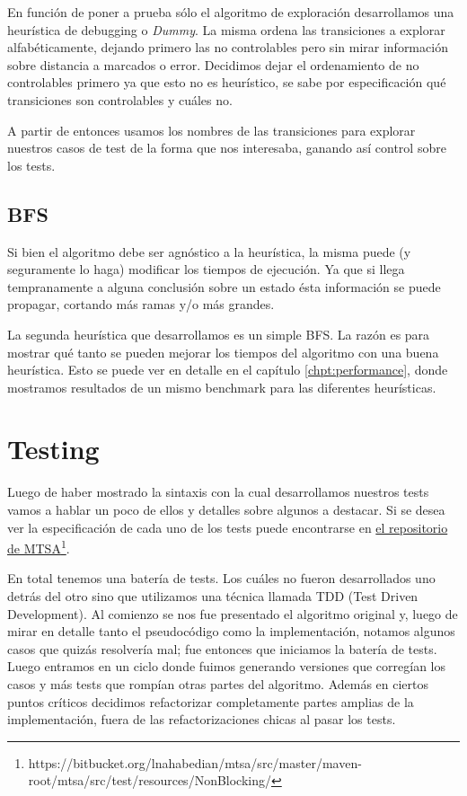 En función de poner a prueba sólo el algoritmo de exploración desarrollamos una heurística de debugging o \textit{Dummy}. La misma ordena las transiciones a explorar alfabéticamente, dejando primero las no controlables pero sin mirar información sobre distancia a marcados o error. Decidimos dejar el ordenamiento de no controlables primero ya que esto no es heurístico, se sabe por especificación qué transiciones son controlables y cuáles no.

A partir de entonces usamos los nombres de las transiciones para explorar nuestros casos de test de la forma que nos interesaba, ganando así control sobre los tests.

\subsection{BFS}
Si bien el algoritmo debe ser agnóstico a la heurística, la misma puede (y seguramente lo haga) modificar los tiempos de ejecución. Ya que si llega tempranamente a alguna conclusión sobre un estado ésta información se puede propagar, cortando más ramas y/o más grandes.

La segunda heurística que desarrollamos es un simple BFS. La razón es para mostrar qué tanto se pueden mejorar los tiempos del algoritmo con una buena heurística. Esto se puede ver en detalle en el capítulo \ref{chpt:performance}, donde mostramos resultados de un mismo benchmark para las diferentes heurísticas.

\section{Testing}
Luego de haber mostrado la sintaxis con la cual desarrollamos nuestros tests vamos a hablar un poco de ellos y detalles sobre algunos a destacar. Si se desea ver la especificación de cada uno de los tests puede encontrarse en \href{https://bitbucket.org/lnahabedian/mtsa/src/master/maven-root/mtsa/src/test/resources/NonBlocking/}{el repositorio de MTSA}\footnote{https://bitbucket.org/lnahabedian/mtsa/src/master/maven-root/mtsa/src/test/resources/NonBlocking/}.

En total tenemos una batería de \totalTests tests. Los cuáles no fueron desarrollados uno detrás del otro sino que utilizamos una técnica llamada TDD (Test Driven Development). Al comienzo se nos fue presentado el algoritmo original y, luego de mirar en detalle tanto el pseudocódigo como la implementación, notamos algunos casos que quizás resolvería mal; fue entonces que iniciamos la batería de tests. 
Luego entramos en un ciclo donde fuimos generando versiones que corregían los casos y más tests que rompían otras partes del algoritmo. Además en ciertos puntos críticos decidimos refactorizar completamente partes amplias de la implementación, fuera de las refactorizaciones chicas al pasar los tests.

